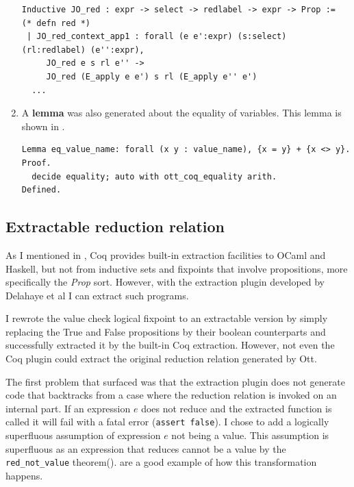 \documentclass[12pt,twoside,notitlepage]{report}
\theoremstyle{plain}%
\theoremstyle{definition}
\theoremstyle{remark}
\begin{document}
\begin{enumerate}
{\begin{minipage}{\linewidth}

\begin{lstlisting}[language={Coq},caption={Coq reduction relation example}, label={lst:coqlogind}]
Inductive JO_red : expr -> select -> redlabel -> expr -> Prop :=    (* defn red *)
 | JO_red_context_app1 : forall (e e':expr) (s:select) (rl:redlabel) (e'':expr),
     JO_red e s rl e'' ->
     JO_red (E_apply e e') s rl (E_apply e'' e')
  ...
\end{lstlisting}

\end{minipage}	
}
\item{A \textbf{lemma} was also generated about the equality of variables. This lemma is shown in .


\begin{minipage}{\linewidth}

\begin{lstlisting}[language={Coq},caption={Coq variable equality lemma}, label={lst:coqeqlabel}]
Lemma eq_value_name: forall (x y : value_name), {x = y} + {x <> y}.
Proof.
  decide equality; auto with ott_coq_equality arith.
Defined.
\end{lstlisting}

\end{minipage}	

}
\end{enumerate} 
\subsection{Extractable reduction relation}
As I mentioned in , Coq provides built-in extraction facilities to OCaml and Haskell, but not from inductive sets and fixpoints that involve propositions, more specifically the \textit{Prop} sort. However, with the extraction plugin developed by Delahaye et al\cite{delahaye2007extracting,tollitte2012producing} I can extract such programs.

I rewrote the value check logical fixpoint to an extractable version by simply replacing the True and False propositions by their boolean counterparts and successfully extracted it by the built-in Coq extraction. However, not even the Coq plugin could extract the original reduction relation generated by Ott. 

The first problem that surfaced was that the extraction plugin does not generate code that backtracks from a case where the reduction relation is invoked on an internal part. If an expression $ e $ does not reduce and the extracted function is called it will fail with a fatal error (\lstinline|assert false|). I chose to add a logically superfluous assumption of expression $ e $ not being a value. This assumption is superfluous as an expression that reduces cannot be a value by the \lstinline[language={Coq}]|red_not_value| theorem().   are a good example of how this transformation happens. \vspace{4mm}
\end{document}
